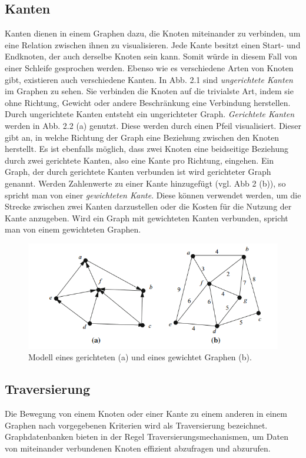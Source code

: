 \subsection{Kanten} %
\label{sec:kanten}
Kanten dienen in einem Graphen dazu, die Knoten miteinander zu verbinden, um eine Relation zwischen ihnen zu visualisieren. Jede Kante besitzt einen Start- und Endknoten, der auch derselbe Knoten sein kann. Somit würde in diesem Fall von einer Schleife gesprochen werden. Ebenso wie es verschiedene Arten von Knoten gibt, existieren auch verschiedene Kanten. 
In Abb. 2.1 sind \textit{ungerichtete Kanten} im Graphen zu sehen. Sie verbinden die Knoten auf die trivialste Art, indem sie ohne Richtung, Gewicht oder andere Beschränkung eine Verbindung herstellen. Durch ungerichtete Kanten entsteht ein ungerichteter Graph.
\textit{Gerichtete Kanten} werden in Abb. 2.2 (a) genutzt. Diese werden durch einen Pfeil visualisiert. Dieser gibt an, in welche Richtung der Graph eine Beziehung zwischen den Knoten herstellt. Es ist ebenfalls möglich, dass zwei Knoten eine beidseitige Beziehung durch zwei gerichtete Kanten, also eine Kante pro Richtung, eingehen. Ein Graph, der durch gerichtete Kanten verbunden ist wird gerichteter Graph genannt.
Werden Zahlenwerte zu einer Kante hinzugefügt (vgl. Abb 2 (b)), so spricht man von einer \textit{gewichteten Kante}. Diese können verwendet werden, um die Strecke zwischen zwei Kanten darzustellen oder die Kosten für die Nutzung der Kante anzugeben. Wird ein Graph mit gewichteten Kanten verbunden, spricht man von einem gewichteten Graphen.\citep{graphTheory} \citep{graphapplication}
\begin{figure}[H]
	\centering
	\includegraphics[scale=1]{Illustrations/graph_01.png}
	\caption{Modell eines gerichteten (a) und eines gewichtet Graphen (b). \citep{graphTheory}}
\end{figure}

\subsection{Traversierung} %
\label{sec:traversierung}
Die Bewegung von einem Knoten oder einer Kante zu einem anderen in einem Graphen nach vorgegebenen Kriterien wird als Traversierung bezeichnet. Graphdatenbanken bieten in der Regel Traversierungsmechanismen, um Daten von miteinander verbundenen Knoten effizient abzufragen und abzurufen. \cite{graph}



